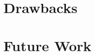 \documentclass[12pt]{beamer}
\begin{document}
\section{Drawbacks} %
\section{Future Work} %


\begin{frame}
  
  
\end{frame}

\end{document}
